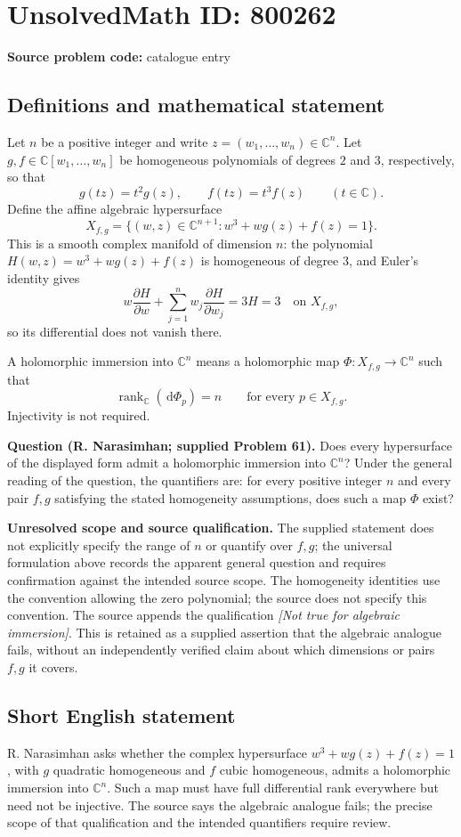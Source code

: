 \documentclass[11pt]{article}
\newcommand{\C}{\mathbb{C}}
\newcommand{\dd}{\,\mathrm{d}}
\begin{document}
\section*{UnsolvedMath ID: 800262}
\textbf{Source problem code:} catalogue entry
\subsection{Definitions and mathematical statement}
Let \(n\) be a positive integer and write \(z=(w_1,\ldots,w_n)\in\C^n\). Let \(g,f\in\C[w_1,\ldots,w_n]\) be homogeneous polynomials of degrees \(2\) and \(3\), respectively, so that
\[
 g(tz)=t^2g(z),\qquad f(tz)=t^3f(z)\qquad(t\in\C).
\]
Define the affine algebraic hypersurface
\[
 X_{f,g}=\bigl\{(w,z)\in\C^{n+1}:w^3+w g(z)+f(z)=1\bigr\}.
\]
This is a smooth complex manifold of dimension \(n\): the polynomial \(H(w,z)=w^3+w g(z)+f(z)\) is homogeneous of degree \(3\), and Euler's identity gives
\[
 w\frac{\partial H}{\partial w}+\sum_{j=1}^n w_j\frac{\partial H}{\partial w_j}=3H=3
 \quad\text{on }X_{f,g},
\]
so its differential does not vanish there.

A holomorphic immersion into \(\C^n\) means a holomorphic map \(\Phi:X_{f,g}\to\C^n\) such that
\[
 \operatorname{rank}_{\C}(\dd\Phi_p)=n\qquad\text{for every }p\in X_{f,g}.
\]
Injectivity is not required.

\textbf{Question (R. Narasimhan; supplied Problem 61).} Does every hypersurface of the displayed form admit a holomorphic immersion into \(\C^n\)? Under the general reading of the question, the quantifiers are: for every positive integer \(n\) and every pair \(f,g\) satisfying the stated homogeneity assumptions, does such a map \(\Phi\) exist?

\textbf{Unresolved scope and source qualification.} The supplied statement does not explicitly specify the range of \(n\) or quantify over \(f,g\); the universal formulation above records the apparent general question and requires confirmation against the intended source scope. The homogeneity identities use the convention allowing the zero polynomial; the source does not specify this convention. The source appends the qualification \emph{[Not true for algebraic immersion]}. This is retained as a supplied assertion that the algebraic analogue fails, without an independently verified claim about which dimensions or pairs \(f,g\) it covers.
\subsection{Short English statement}
R. Narasimhan asks whether the complex hypersurface \(w^3+w g(z)+f(z)=1\), with \(g\) quadratic homogeneous and \(f\) cubic homogeneous, admits a holomorphic immersion into \(\C^n\). Such a map must have full differential rank everywhere but need not be injective. The source says the algebraic analogue fails; the precise scope of that qualification and the intended quantifiers require review.
\end{document}
